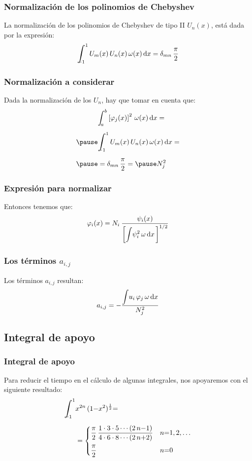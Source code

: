 \documentclass[12pt]{beamer}
\begin{document}
\begin{frame}
\frametitle{Normalización de los polinomios de Chebyshev}
La normalización de los polinomios de Chebyshev de tipo II $U_{n}(x)$, está dada por la expresión:
\pause
\begin{align*}
\scaleint{6ex}_{\bs \bs -1}^{1} \, U_{m}(x) \, U_{n} (x) \, \omega (x) \dd{x} = \delta_{mn} \, \dfrac{\pi}{2}
\end{align*}
\end{frame}
\begin{frame}
\frametitle{Normalización a considerar}
Dada la normalización de los $U_{n}$, hay que tomar en cuenta que:
\pause
\begin{eqnarray*}
&\scaleint{5ex}_{\bs a}^{b} \left[ \varphi_{j} (x) \right]^{2} \, \omega (x) \dd{x} = \\[0.5em] \pause
&\scaleint{6ex}_{\bs \bs -1}^{1} \, U_{m}(x) \, U_{n} (x) \, \omega (x) \dd{x} = \\[0.5em] \pause
&= \delta_{mn} \, \dfrac{\pi}{2} = \pause N_{j}^{2}
\end{eqnarray*}
\end{frame}
\begin{frame}
\frametitle{Expresión para normalizar}
Entonces tenemos que:
\pause
\begin{align*}
\varphi_{i} (x) =  N_{i} \: \dfrac{\psi_{i} (x)}{ \bigg[ \displaystyle \scaleint{5ex} \psi_{i}^{2} \, \omega \dd{x} \bigg]^{1/2}}
\end{align*}
\end{frame}
\begin{frame}
\frametitle{Los términos $a_{i,j}$}
Los términos $a_{i,j}$ resultan:
\pause
\begin{align}
a_{i, j} = - \dfrac{ \displaystyle \scaleint{5ex} u_{i} \, \varphi_{j} \, \omega \dd{x}}{N_{j}^{2}}
\label{eq:ecuacion_10_49a2}
\end{align}
\end{frame}    

\subsection*{Integral de apoyo}

\begin{frame}
\frametitle{Integral de apoyo}
Para reducir el tiempo en el cálculo de algunas integrales, nos apoyaremos con el siguiente resultado:
\pause
\begin{align*}
\scaleint{6ex}_{\bs \bs -1}^{1} &x^{2n} \, (1 {-} x^{2})^{\frac{1}{2}} {=} \\[0.5em]
&= \begin{cases}
\dfrac{\pi}{2} \, \dfrac{1 \cdot 3 \cdot 5 \cdots (2 \, n {-} 1)}{4 \cdot 6 \cdot 8 \cdots (2 \, n {+} 2)} & n {=} 1, 2, \ldots \\[1em]
\dfrac{\pi}{2} & n {=} 0
\end{cases}
\end{align*}
\end{frame}
\end{document}
